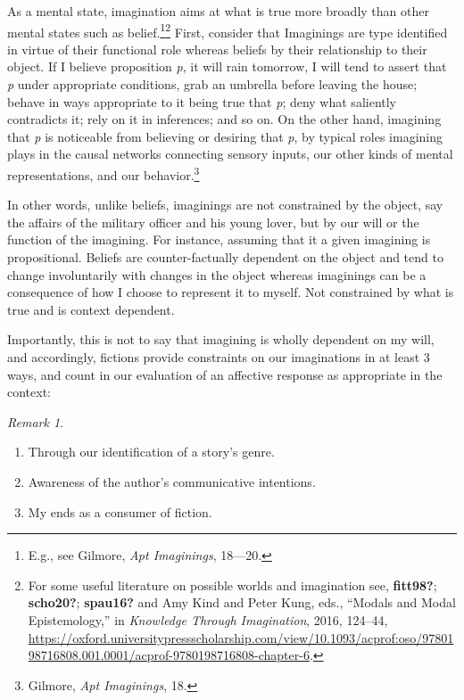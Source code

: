 \documentclass[
  12pt,
]{book}
\providecommand{\tightlist}{%
  \setlength{\itemsep}{0pt}\setlength{\parskip}{0pt}}
\providecommand{\tightlist}{%
  \setlength{\itemsep}{0pt}\setlength{\parskip}{0pt}}
\theoremstyle{definition}
\theoremstyle{definition}
\theoremstyle{definition}
\theoremstyle{definition}
\theoremstyle{remark}
\newtheorem*{remark}{Remark}
\begin{document}
As a mental state, imagination aims at what is true more broadly than other mental states such as belief.\footnote{E.g., see Gilmore, \emph{Apt {Imaginings}}, 18---20.}\footnote{For some useful literature on possible worlds and imagination see, \textbf{fitt98?}; \textbf{scho20?}; \textbf{spau16?} and Amy Kind and Peter Kung, eds., {``Modals and {Modal Epistemology},''} in \emph{Knowledge {Through Imagination}}, 2016, 124--44, \url{https://oxford.universitypressscholarship.com/view/10.1093/acprof:oso/9780198716808.001.0001/acprof-9780198716808-chapter-6}.} First, consider that Imaginings are type identified in virtue of their functional role whereas beliefs by their relationship to their object. If I believe proposition \emph{p}, it will rain tomorrow, I will tend to assert that \emph{p} under appropriate conditions, grab an umbrella before leaving the house; behave in ways appropriate to it being true that \emph{p}; deny what saliently contradicts it; rely on it in inferences; and so on. On the other hand, imagining that \emph{p} is noticeable from believing or desiring that \emph{p}, by typical roles imagining plays in the causal networks connecting sensory inputs, our other kinds of mental representations, and our behavior.\footnote{Gilmore, \emph{Apt {Imaginings}}, 18.}

In other words, unlike beliefs, imaginings are not constrained by the object, say the affairs of the military officer and his young lover, but by our will or the function of the imagining. For instance, assuming that it a given imagining is propositional. Beliefs are counter-factually dependent on the object and tend to change involuntarily with changes in the object whereas imaginings can be a consequence of how I choose to represent it to myself. Not constrained by what is true and is context dependent.

Importantly, this is not to say that imagining is wholly dependent on my will, and accordingly, fictions provide constraints on our imaginations in at least 3 ways, and count in our evaluation of an affective response as appropriate in the context:

\begin{remark}
\leavevmode

\begin{enumerate}
\def\labelenumi{\arabic{enumi}.}
\tightlist
\item
  Through our identification of a story's genre.
\item
  Awareness of the author's communicative intentions.
\item
  My ends as a consumer of fiction.
\end{enumerate}

\end{remark}
\end{document}
